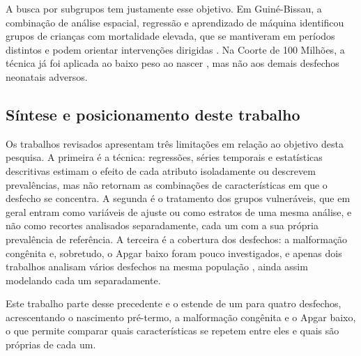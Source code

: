A busca por subgrupos tem justamente esse objetivo. Em Guiné-Bissau, a combinação de análise espacial, regressão e aprendizado de máquina identificou grupos de crianças com mortalidade elevada, que se mantiveram em períodos distintos e podem orientar intervenções dirigidas \cite{rieckmann2024}. Na Coorte de 100 Milhões, a técnica já foi aplicada ao baixo peso ao nascer \cite{cunha2024}, mas não aos demais desfechos neonatais adversos.

\subsection{Síntese e posicionamento deste trabalho}\label{subsec:rel-lacuna}

Os trabalhos revisados apresentam três limitações em relação ao objetivo desta pesquisa. A primeira é a técnica: regressões, séries temporais e estatísticas descritivas estimam o efeito de cada atributo isoladamente ou descrevem prevalências, mas não retornam as combinações de características em que o desfecho se concentra. A segunda é o tratamento dos grupos vulneráveis, que em geral entram como variáveis de ajuste ou como estratos de uma mesma análise, e não como recortes analisados separadamente, cada um com a sua própria prevalência de referência. A terceira é a cobertura dos desfechos: a malformação congênita e, sobretudo, o Apgar baixo foram pouco investigados, e apenas dois trabalhos analisam vários desfechos na mesma população \cite{reboucas2024,pescarini2024}, ainda assim modelando cada um separadamente.

Este trabalho parte desse precedente \cite{cunha2024} e o estende de um para quatro desfechos, acrescentando o nascimento pré-termo, a malformação congênita e o Apgar baixo, o que permite comparar quais características se repetem entre eles e quais são próprias de cada um.
